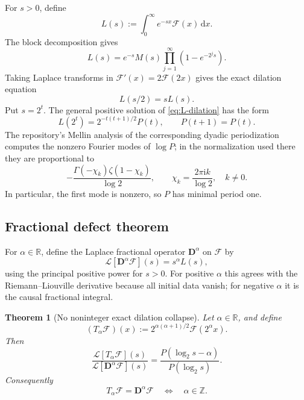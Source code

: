 \documentclass[11pt]{article}
\newtheorem{theorem}{Theorem}[section]
\theoremstyle{definition}
\theoremstyle{remark}
\newcommand{\R}{\mathbb R}
\newcommand{\dd}{\,\mathrm d}
\newcommand{\ii}{\mathrm i}
\newcommand{\FF}{\mathscr F}
\newcommand{\Lap}{\mathcal L}
\begin{document}
For \(s>0\), define
\begin{equation}
 L(s):=\int_0^\infty e^{-sx}\FF(x)\dd x.                  \label{eq:global-L}
\end{equation}
The block decomposition gives
\begin{equation}
 L(s)=e^{-s}M(s)\prod_{j=1}^{\infty}(1-e^{-2^js}).        \label{eq:global-L-product}
\end{equation}
Taking Laplace transforms in \(\FF'(x)=2\FF(2x)\) gives the exact dilation equation
\begin{equation}
 L(s/2)=sL(s).                                             \label{eq:L-dilation}
\end{equation}
Put \(s=2^t\).  The general positive solution of \eqref{eq:L-dilation} has the form
\begin{equation}
 L(2^t)=2^{-t(t+1)/2}P(t),\qquad P(t+1)=P(t).             \label{eq:L-periodic}
\end{equation}
The repository's Mellin analysis of the corresponding dyadic periodization computes the
nonzero Fourier modes of \(\log P\); in the normalization used there they are proportional
to
\begin{equation}
 -\frac{\Gamma(-\chi_k)\zeta(1-\chi_k)}{\log2},\qquad
 \chi_k=\frac{2\pi\ii k}{\log2},\quad k\ne0.             \label{eq:P-Fourier}
\end{equation}
In particular, the first mode is nonzero, so \(P\) has minimal period one.

\subsection{Fractional defect theorem}

For \(\alpha\in\R\), define the Laplace fractional operator
\(\mathbf D^\alpha\) on \(\FF\) by
\begin{equation}
 \Lap[\mathbf D^\alpha\FF](s)=s^\alpha L(s),              \label{eq:fractional-Laplace-def}
\end{equation}
using the principal positive power for \(s>0\).  For positive \(\alpha\) this agrees
with the Riemann--Liouville derivative because all initial data vanish; for negative
\(\alpha\) it is the causal fractional integral.

\begin{theorem}[No noninteger exact dilation collapse]
\label{thm:fractional-obstruction}
Let \(\alpha\in\R\), and define
\begin{equation}
 (T_\alpha\FF)(x):=2^{\alpha(\alpha+1)/2}\FF(2^\alpha x). \label{eq:Talpha}
\end{equation}
Then
\begin{equation}
 \frac{\Lap[T_\alpha\FF](s)}{\Lap[\mathbf D^\alpha\FF](s)}
 =\frac{P(\log_2s-\alpha)}{P(\log_2s)}.                  \label{eq:fractional-defect}
\end{equation}
Consequently
\begin{equation}
 T_\alpha\FF=\mathbf D^\alpha\FF
 \quad\Longleftrightarrow\quad\alpha\in\mathbb Z.       \label{eq:fractional-iff-integer}
\end{equation}
\end{theorem}
\end{document}
